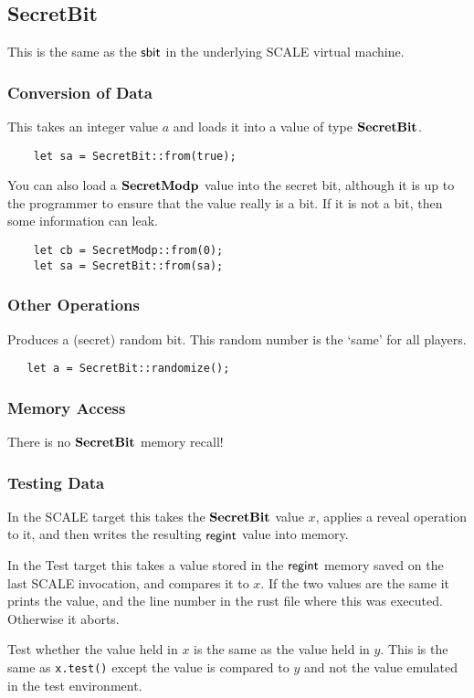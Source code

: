 \subsection{SecretBit}
This is the same as the $\mathsf{sbit}$ in the underlying SCALE virtual machine.

\subsubsection{Conversion of Data}
This takes an integer value $a$ and loads it into a value
of type $\mathbf{SecretBit}$.
\begin{lstlisting}
    let sa = SecretBit::from(true);
\end{lstlisting}
You can also load a $\mathbf{SecretModp}$ value into the secret bit,
although it is up to the programmer to ensure that
the value really is a bit. If it is not a bit, then some
information can leak.
\begin{lstlisting}
    let cb = SecretModp::from(0);
    let sa = SecretBit::from(sa);
\end{lstlisting}

\subsubsection{Other Operations}

Produces a (secret) random bit.
This random number is the `same' for all players.
\begin{lstlisting}
   let a = SecretBit::randomize();
\end{lstlisting}

\subsubsection{Memory Access}
There is no $\mathbf{SecretBit}$ memory recall!

\subsubsection{Testing Data}
In the SCALE target this takes the $\mathbf{SecretBit}$ value $x$,
applies a reveal operation to it, and then writes the
resulting $\mathsf{regint}$ value into memory.

In the Test target this takes a value stored in the $\mathsf{regint}$
memory saved on the last SCALE invocation, and compares it to
$x$. If the two values are the same it prints the value, and the
line number in the rust file where this was executed.
Otherwise it aborts.

Test whether the value held in $x$ is the same as the value held in $y$.
This is the same as \verb|x.test()| except the value is compared to
$y$ and not the value emulated in the test environment.
